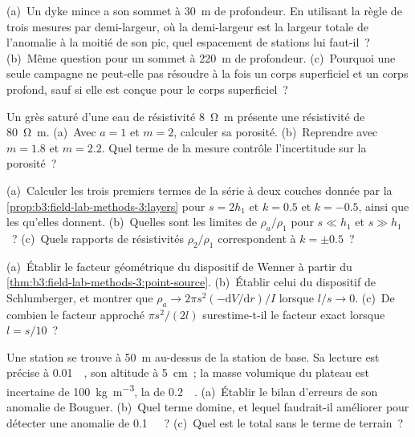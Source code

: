 \begin{exercise}[$\star\star$]\label{exo:b3:field-lab-methods-3:7}
(a)~Un dyke mince a son sommet à \qty{30}{m} de profondeur. En utilisant la règle de
trois mesures par demi-largeur, où la demi-largeur est la largeur totale de
l'anomalie à la moitié de son pic, quel espacement de stations lui faut-il~? (b)~Même
question pour un sommet à \qty{220}{m} de profondeur. (c)~Pourquoi une seule campagne
ne peut-elle pas résoudre à la fois un corps superficiel et un corps profond, sauf si
elle est conçue pour le corps superficiel~?
\end{exercise}

\begin{exercise}[$\star\star$]\label{exo:b3:field-lab-methods-3:8}
Un grès saturé d'une eau de résistivité \qty{8}{\ohm\metre} présente une résistivité de
\qty{80}{\ohm\metre}. (a)~Avec $a = 1$ et $m = 2$, calculer sa porosité. (b)~Reprendre
avec $m = 1.8$ et $m = 2.2$. Quel terme de la mesure contrôle l'incertitude sur la
porosité~?
\end{exercise}

\begin{exercise}[$\star\star$]\label{exo:b3:field-lab-methods-3:9}
(a)~Calculer les trois premiers termes de la série à deux couches donnée
par la \cref{prop:b3:field-lab-methods-3:layers} pour $s = 2h_1$ et $k =
\num{0.5}$ et $k = \num{-0.5}$, ainsi que les 
qu'elles donnent. (b)~Quelles sont les limites de $\rho_a/\rho_1$ pour $s \ll h_1$ et
$s \gg h_1$~? (c)~Quels rapports de résistivités $\rho_2/\rho_1$ correspondent à
$k = \pm 0.5$~?
\end{exercise}

\begin{exercise}[$\star\star\star$]\label{exo:b3:field-lab-methods-3:10}
(a)~Établir le facteur géométrique du dispositif de Wenner à partir
du \cref{thm:b3:field-lab-methods-3:point-source}. (b)~Établir celui du
dispositif de Schlumberger, et montrer que $\rho_a \to 2\pi s^2(-\mathrm{d}V/
\mathrm{d}r)/I$ lorsque $l/s \to 0$. (c)~De combien le facteur approché
$\pi s^2/(2l)$ surestime-t-il le facteur exact lorsque $l = s/10$~?
\end{exercise}

\begin{exercise}[$\star\star\star$]\label{exo:b3:field-lab-methods-3:11}
Une station se trouve à \qty{50}{m} au-dessus de la station de base. Sa lecture est précise à
\qty{0.01}{\milli\gal}, son altitude à \qty{5}{cm}~; la masse volumique du
plateau est incertaine de \qty{100}{kg.m^{-3}}, la  de
\qty{0.2}{\milli\gal}. (a)~Établir le bilan d'erreurs de son anomalie
de Bouguer. (b)~Quel terme domine, et lequel faudrait-il améliorer pour
détecter une anomalie de \qty{0.1}{\milli\gal}~? (c)~Quel est le total sans
le terme de terrain~?
\end{exercise}

